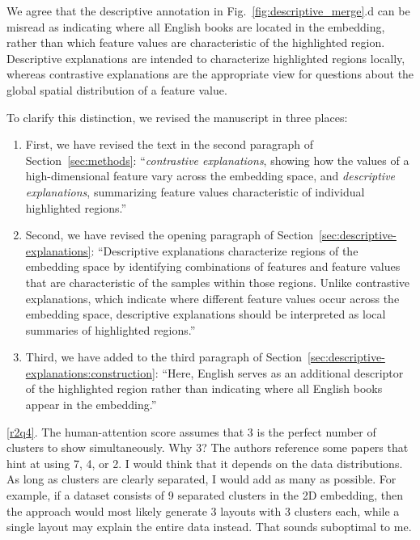 \documentclass[11pt]{article}
\newcounter{rtaskno}
\newcommand{\rtask}[1]{\refstepcounter{rtaskno}\label{#1}}
\newcommand{\reviewc}[2]{\begin{leftbar}\noindent\rtask{#1}\ref{#1}. #2\end{leftbar}\vspace*{-4mm}}
\newcommand{\answer}[1]{\noindent #1\par\vspace{2mm}}
\newlength{\leftbarwidth}
\newlength{\leftbarsep}
\renewenvironment{leftbar}{%
    \def\FrameCommand{{\color{black}{\vrule width \leftbarwidth\relax\hspace {\leftbarsep}}}}%
    \MakeFramed {\advance \hsize -\width \FrameRestore }%
}{\endMakeFramed}
\begin{document}
\answer{%
We agree that the descriptive annotation in Fig.~\ref{fig:descriptive_merge}.d can be misread as indicating where all English books are located in the embedding, rather than which feature values are characteristic of the highlighted region. Descriptive explanations are intended to characterize highlighted regions locally, whereas contrastive explanations are the appropriate view for questions about the global spatial distribution of a feature value.

To clarify this distinction, we revised the manuscript in three places:
\begin{enumerate}
\item First, we have revised the text in the second paragraph of Section~\ref{sec:methods}: ``\textit{contrastive explanations}, showing how the values of a high-dimensional feature vary across the embedding space, and \textit{descriptive explanations}, summarizing feature values characteristic of individual highlighted regions.''

\item Second, we have revised the opening paragraph of Section~\ref{sec:descriptive-explanations}: ``Descriptive explanations characterize regions of the embedding space by identifying combinations of features and feature values that are characteristic of the samples within those regions. Unlike contrastive explanations, which indicate where different feature values occur across the embedding space, descriptive explanations should be interpreted as local summaries of highlighted regions.''

\item Third, we have added to the third paragraph of Section~\ref{sec:descriptive-explanations:construction}: ``Here, English serves as an additional descriptor of the highlighted region rather than indicating where all English books appear in the embedding.''
\end{enumerate}
}


\reviewc{r2q4}{The human-attention score assumes that 3 is the perfect number of clusters to show simultaneously. Why 3? The authors reference some papers that hint at using 7, 4, or 2. I would think that it depends on the data distributions. As long as clusters are clearly separated, I would add as many as possible. For example, if a dataset consists of 9 separated clusters in the 2D embedding, then the approach would most likely generate 3 layouts with 3 clusters each, while a single layout may explain the entire data instead. That sounds suboptimal to me.}
\end{document}
